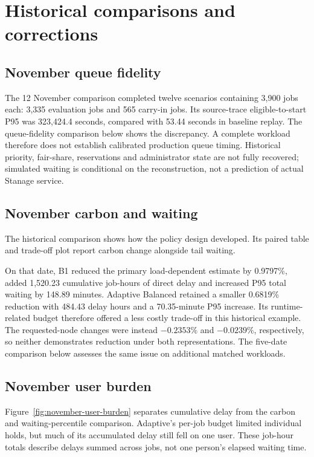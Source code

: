 \section{Historical comparisons and corrections}
\subsection{November queue fidelity}
The 12 November comparison completed twelve scenarios containing 3,900 jobs each: 3,335 evaluation jobs and 565 carry-in jobs. Its source-trace eligible-to-start P95 was 323,424.4 seconds, compared with 53.44 seconds in baseline replay. The queue-fidelity comparison below shows the discrepancy. A complete workload therefore does not establish calibrated production queue timing. Historical priority, fair-share, reservations and administrator state are not fully recovered; simulated waiting is conditional on the reconstruction, not a prediction of actual Stanage service.

\FloatBarrier

\subsection{November carbon and waiting}
The historical comparison shows how the policy design developed. Its paired table and trade-off plot report carbon change alongside tail waiting.


\FloatBarrier

On that date, B1 reduced the primary load-dependent estimate by 0.9797\%, added 1,520.23 cumulative job-hours of direct delay and increased P95 total waiting by 148.89 minutes. Adaptive Balanced retained a smaller 0.6819\% reduction with 484.43 delay hours and a 70.35-minute P95 increase. Its runtime-related budget therefore offered a less costly trade-off in this historical example. The requested-node changes were instead $-0.2353\%$ and $-0.0239\%$, respectively, so neither demonstrates reduction under both representations. The five-date comparison below assesses the same issue on additional matched workloads.

\subsection{November user burden}
Figure~\ref{fig:november-user-burden} separates cumulative delay from the carbon and waiting-percentile comparison. Adaptive's per-job budget limited individual holds, but much of its accumulated delay still fell on one user. These job-hour totals describe delays summed across jobs, not one person's elapsed waiting time.

\FloatBarrier

